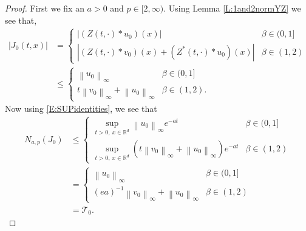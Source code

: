 \documentclass[12pt]{report}
\theoremstyle{plain}
\theoremstyle{definition}
\numberwithin{equation}{section}
\newcommand{\R}{\mathbb{R}}
\newcommand{\Norm}[1]{\left\|  #1   \right\|}
\begin{document}
\begin{proof}
	First we fix an $a>0$ and $p \in [2,\infty)$. Using Lemma \ref{L:1and2normYZ} we see that,
	\begin{align*}
	|J_0(t,x)|  &= \begin{cases} 
	\left| (Z(t,\cdot) * u_0)(x)  \right| & \beta \in (0,1]
	\\	\left| (Z(t,\cdot) * v_0)(x) + (Z^*(t,\cdot) * u_0)(x) \right| & \beta \in (1,2)
	\end{cases}
	\\& \le \begin{cases}
	\Norm{u_0}_\infty & \beta \in (0,1]
	\\ t\Norm{v_0}_\infty + \Norm{u_0}_\infty & \beta \in (1,2).
	\end{cases} 
	\end{align*}
	Now using \eqref{E:SUPidentities}, we see that
	\begin{align}
	N_{a,p}(J_0) &\le \begin{cases} 
	\sup\limits_{t > 0, \: x\in\R^d}  \Norm{u_0}_\infty e^{-at} & \beta \in (0,1]
	\\ \sup\limits_{t > 0, \: x\in\R^d} \left(  t\Norm{v_0}_\infty + \Norm{u_0}_\infty \right) e^{-at} & \beta \in (1,2)
	\end{cases} \nonumber \\
	&= \begin{cases} 
	\Norm{u_0}_\infty  & \beta \in (0,1]
	\\(ea)^{-1} \Norm{v_0}_\infty + \Norm{u_0}_\infty & \beta \in (1,2)
	\end{cases} \nonumber \\
	&= \mathcal{T}_0. \label{E:Jbdd}
	\end{align} 

\end{proof}
\end{document}
